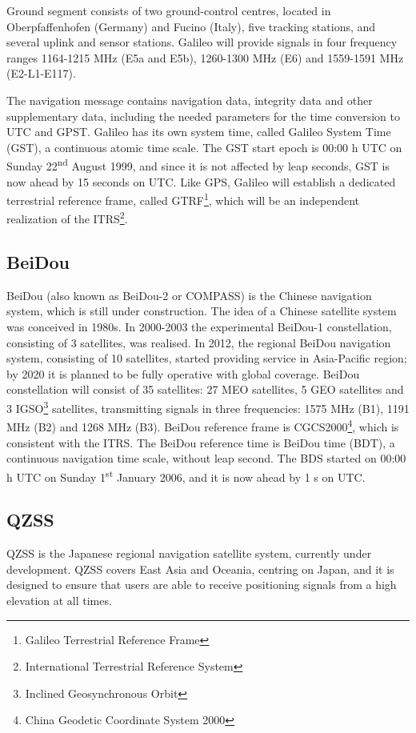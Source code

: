 Ground segment consists of two ground-control centres, located in Oberpfaffenhofen (Germany) and Fucino (Italy), five tracking stations, and several uplink and sensor stations. Galileo will provide signals in four frequency ranges 1164-1215 MHz (E5a and E5b), 1260-1300 MHz (E6) and 1559-1591 MHz (E2-L1-E117).

The navigation message contains navigation data, integrity data and other supplementary data, including the needed parameters for the time conversion to UTC and GPST. Galileo has its own system time, called Galileo System Time (GST), a continuous atomic time scale. The
GST start epoch is 00:00 h UTC on Sunday 22\textsuperscript{nd} August 1999, and since it is not affected by leap seconds, GST is now ahead by 15 seconds on UTC. Like GPS, Galileo will establish a dedicated terrestrial reference frame, called GTRF\footnote{Galileo Terrestrial Reference Frame}, which will be an
independent realization of the ITRS\footnote{International Terrestrial Reference System}.

\subsection{BeiDou}

BeiDou (also known as BeiDou-2 or COMPASS) is the Chinese navigation system, which is still under construction. The idea of a Chinese satellite system was conceived in 1980s. In 2000-2003 the experimental BeiDou-1 constellation, consisting of 3 satellites, was realised. In 2012, the regional BeiDou navigation system, consisting of 10 satellites, started providing service in Asia-Pacific region; by 2020 it is planned to be fully operative with global coverage.
BeiDou constellation will consist of 35 satellites: 27 MEO satellites, 5 GEO satellites and 3 IGSO\footnote{Inclined Geosynchronous Orbit} satellites, transmitting signals in three frequencies: 1575 MHz (B1), 1191 MHz (B2) and 1268 MHz (B3). BeiDou reference frame is CGCS2000\footnote{China Geodetic Coordinate System 2000}, which is consistent with the ITRS. The BeiDou reference time is
BeiDou time (BDT), a continuous navigation time scale, without leap second. The BDS started on 00:00 h UTC on Sunday 1\textsuperscript{st} January 2006, and it is now ahead by 1 s on UTC.

\subsection{QZSS}

QZSS is the Japanese regional navigation satellite system, currently under development. QZSS covers East Asia and Oceania, centring on Japan, and it is designed to ensure that users are able to receive positioning signals from a high elevation at all times.

